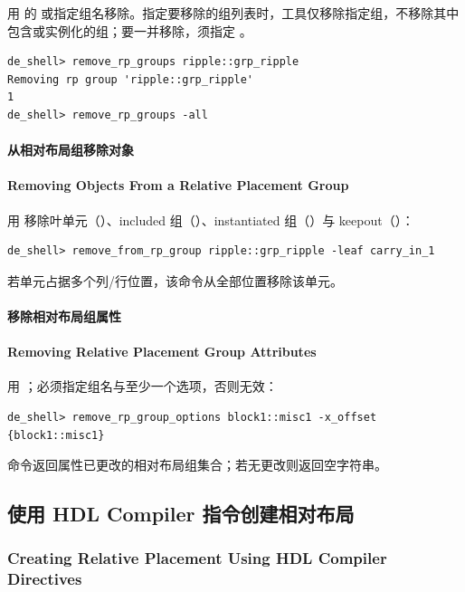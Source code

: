 用  的  或指定组名移除。指定要移除的组列表时，工具仅移除指定组，不移除其中包含或实例化的组；要一并移除，须指定 。

\begin{lstlisting}
de_shell> remove_rp_groups ripple::grp_ripple
Removing rp group 'ripple::grp_ripple'
1
de_shell> remove_rp_groups -all
\end{lstlisting}

\paragraph{从相对布局组移除对象}
\paragraph*{Removing Objects From a Relative Placement Group}

用  移除叶单元（）、included 组（）、instantiated 组（）与 keepout（）：
\begin{lstlisting}
de_shell> remove_from_rp_group ripple::grp_ripple -leaf carry_in_1
\end{lstlisting}

若单元占据多个列/行位置，该命令从全部位置移除该单元。

\paragraph{移除相对布局组属性}
\paragraph*{Removing Relative Placement Group Attributes}

用 ；必须指定组名与至少一个选项，否则无效：
\begin{lstlisting}
de_shell> remove_rp_group_options block1::misc1 -x_offset
{block1::misc1}
\end{lstlisting}

命令返回属性已更改的相对布局组集合；若无更改则返回空字符串。

\subsection{使用 HDL Compiler 指令创建相对布局}
\subsubsection*{Creating Relative Placement Using HDL Compiler Directives}

